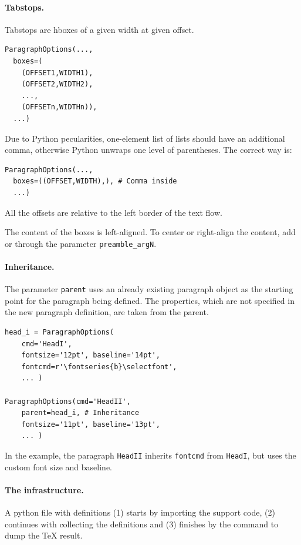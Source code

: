 \documentclass[]{ltugboat}
\begin{document}
\paragraph{Tabstops.} Tabstops are hboxes of a given width at given offset.

\begin{verbatim}
ParagraphOptions(...,
  boxes=(
    (OFFSET1,WIDTH1),
    (OFFSET2,WIDTH2),
    ...,
    (OFFSETn,WIDTHn)),
  ...)
\end{verbatim}

Due to Python pecularities, one-element list of lists should have an additional comma, otherwise Python unwraps one level of parentheses. The correct way is:

\begin{verbatim}
ParagraphOptions(...,
  boxes=((OFFSET,WIDTH),), # Comma inside
  ...)
\end{verbatim}

All the offsets are relative to the left border of the text flow.

The content of the boxes is left-aligned. To center or right-align the content, add  or  through the parameter \verb|preamble_argN|.

\paragraph{Inheritance.} The parameter \verb|parent| uses an already existing paragraph object as the starting point for the paragraph being defined. The properties, which are not specified in the new paragraph definition, are taken from the parent.

\begin{verbatim}
head_i = ParagraphOptions(
    cmd='HeadI',
    fontsize='12pt', baseline='14pt',
    fontcmd=r'\fontseries{b}\selectfont',
    ... )

ParagraphOptions(cmd='HeadII',
    parent=head_i, # Inheritance
    fontsize='11pt', baseline='13pt',
    ... )
\end{verbatim}

In the example, the paragraph \verb|HeadII| inherits \verb|fontcmd| from \verb|HeadI|, but uses the custom font size and baseline.

\paragraph{The infrastructure.} A python file with definitions (1) starts by importing the support code, (2) continues with collecting the definitions and (3) finishes by the command to dump the \TeX{} result.
\end{document}
